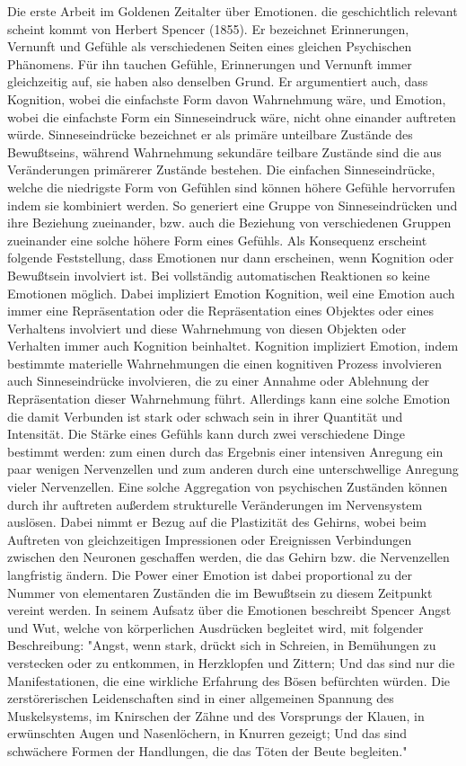 Die erste Arbeit im Goldenen Zeitalter über Emotionen. die geschichtlich relevant scheint kommt von Herbert Spencer (1855). Er bezeichnet Erinnerungen, Vernunft und Gefühle als verschiedenen Seiten eines gleichen Psychischen Phänomens. Für ihn tauchen Gefühle, Erinnerungen und Vernunft immer gleichzeitig auf, sie haben also denselben Grund. Er argumentiert auch, dass Kognition, wobei die einfachste Form davon Wahrnehmung wäre, und Emotion, wobei die einfachste Form ein Sinneseindruck wäre, nicht ohne einander auftreten würde. Sinneseindrücke bezeichnet er als primäre unteilbare Zustände des Bewußtseins, während Wahrnehmung sekundäre teilbare Zustände sind die aus Veränderungen primärerer Zustände bestehen. Die einfachen Sinneseindrücke, welche die niedrigste Form von Gefühlen sind können höhere Gefühle hervorrufen indem sie kombiniert werden. So generiert eine Gruppe von Sinneseindrücken und ihre Beziehung zueinander, bzw. auch die Beziehung von verschiedenen Gruppen zueinander eine solche höhere Form eines Gefühls. Als Konsequenz erscheint folgende Feststellung, dass Emotionen nur dann erscheinen, wenn Kognition oder Bewußtsein involviert ist. Bei vollständig automatischen Reaktionen so keine Emotionen möglich.
Dabei impliziert Emotion Kognition, weil eine Emotion auch immer eine Repräsentation oder die Repräsentation eines Objektes oder eines Verhaltens involviert und diese Wahrnehmung von diesen Objekten oder Verhalten immer auch Kognition beinhaltet. Kognition impliziert Emotion, indem bestimmte materielle Wahrnehmungen die einen kognitiven Prozess involvieren auch Sinneseindrücke involvieren, die zu einer Annahme oder Ablehnung der Repräsentation dieser Wahrnehmung führt. Allerdings kann eine solche Emotion die damit Verbunden ist stark oder schwach sein in ihrer Quantität und Intensität.  
Die Stärke eines Gefühls kann durch zwei verschiedene Dinge bestimmt werden: zum einen durch das Ergebnis einer intensiven Anregung ein paar wenigen Nervenzellen und zum anderen durch eine unterschwellige Anregung vieler Nervenzellen. Eine solche Aggregation von psychischen Zuständen können durch ihr auftreten außerdem strukturelle Veränderungen im Nervensystem auslösen. Dabei nimmt er Bezug auf die Plastizität des Gehirns, wobei beim Auftreten von gleichzeitigen Impressionen oder Ereignissen Verbindungen zwischen den Neuronen geschaffen werden, die das Gehirn bzw. die Nervenzellen langfristig ändern. 
Die Power einer Emotion ist dabei proportional zu der Nummer von elementaren Zuständen die im Bewußtsein zu diesem Zeitpunkt vereint werden. In seinem Aufsatz über die Emotionen beschreibt Spencer Angst und Wut, welche von körperlichen Ausdrücken begleitet wird, mit folgender Beschreibung: "Angst, wenn stark, drückt sich in Schreien, in Bemühungen zu verstecken oder zu entkommen, in Herzklopfen und Zittern; Und das sind nur die Manifestationen, die eine wirkliche Erfahrung des Bösen befürchten würden. Die zerstörerischen Leidenschaften sind in einer allgemeinen Spannung des Muskelsystems, im Knirschen der Zähne und des Vorsprungs der Klauen, in erwünschten Augen und Nasenlöchern, in Knurren gezeigt; Und das sind schwächere Formen der Handlungen, die das Töten der Beute begleiten."
